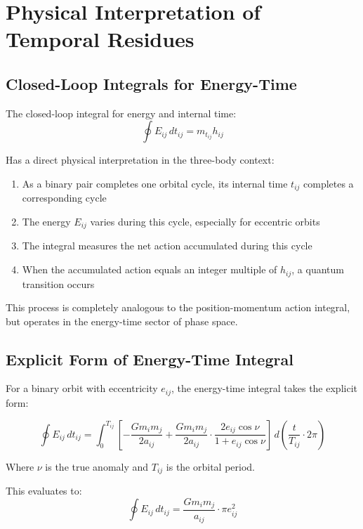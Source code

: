 \documentclass{article}
\begin{document}
\section{Physical Interpretation of Temporal Residues}

\subsection{Closed-Loop Integrals for Energy-Time}

The closed-loop integral for energy and internal time:
\begin{equation}
\oint E_{ij} \, dt_{ij} = m_{t_{ij}} h_{ij}
\end{equation}

Has a direct physical interpretation in the three-body context:

\begin{enumerate}
\item As a binary pair completes one orbital cycle, its internal time $t_{ij}$ completes a corresponding cycle
\item The energy $E_{ij}$ varies during this cycle, especially for eccentric orbits
\item The integral measures the net action accumulated during this cycle
\item When the accumulated action equals an integer multiple of $h_{ij}$, a quantum transition occurs
\end{enumerate}

This process is completely analogous to the position-momentum action integral, but operates in the energy-time sector of phase space.

\subsection{Explicit Form of Energy-Time Integral}

For a binary orbit with eccentricity $e_{ij}$, the energy-time integral takes the explicit form:

\begin{equation}
\oint E_{ij} \, dt_{ij} = \int_0^{T_{ij}} \left[-\frac{G m_i m_j}{2a_{ij}} + \frac{G m_i m_j}{2a_{ij}} \cdot \frac{2e_{ij}\cos\nu}{1+e_{ij}\cos\nu}\right] \, d\left(\frac{t}{T_{ij}} \cdot 2\pi\right)
\end{equation}

Where $\nu$ is the true anomaly and $T_{ij}$ is the orbital period.

This evaluates to:
\begin{equation}
\oint E_{ij} \, dt_{ij} = \frac{G m_i m_j}{a_{ij}} \cdot \pi e_{ij}^2
\end{equation}
\end{document}
